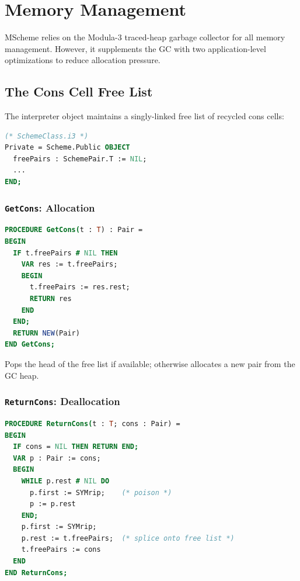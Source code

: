 \documentclass[12pt]{report}
\begin{document}
\chapter{Memory Management}
\label{ch:memory}

MScheme relies on the Modula-3 traced-heap garbage collector for all
memory management.  However, it supplements the GC with two
application-level optimizations to reduce allocation pressure.

\section{The Cons Cell Free List}
\label{sec:conspools}

The interpreter object maintains a singly-linked free list of recycled
cons cells:

\begin{lstlisting}[language=Modula3]
(* SchemeClass.i3 *)
Private = Scheme.Public OBJECT
  freePairs : SchemePair.T := NIL;
  ...
END;
\end{lstlisting}

\subsection{\texttt{GetCons}: Allocation}

\begin{lstlisting}[language=Modula3]
PROCEDURE GetCons(t : T) : Pair =
BEGIN
  IF t.freePairs # NIL THEN
    VAR res := t.freePairs;
    BEGIN
      t.freePairs := res.rest;
      RETURN res
    END
  END;
  RETURN NEW(Pair)
END GetCons;
\end{lstlisting}

Pops the head of the free list if available; otherwise allocates a new
pair from the GC heap.

\subsection{\texttt{ReturnCons}: Deallocation}

\begin{lstlisting}[language=Modula3]
PROCEDURE ReturnCons(t : T; cons : Pair) =
BEGIN
  IF cons = NIL THEN RETURN END;
  VAR p : Pair := cons;
  BEGIN
    WHILE p.rest # NIL DO
      p.first := SYMrip;    (* poison *)
      p := p.rest
    END;
    p.first := SYMrip;
    p.rest := t.freePairs;  (* splice onto free list *)
    t.freePairs := cons
  END
END ReturnCons;
\end{lstlisting}
\end{document}
